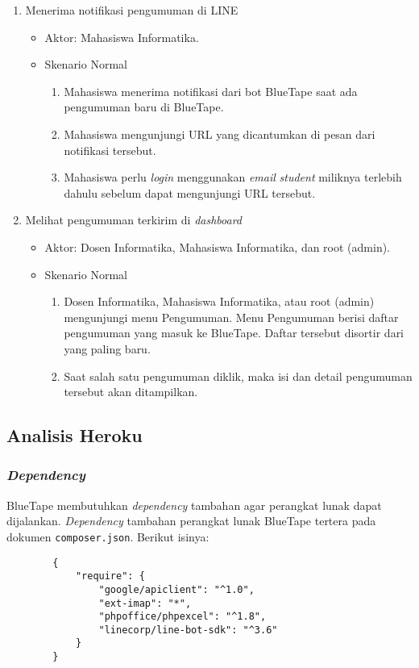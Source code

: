 \begin{enumerate}
\item Menerima notifikasi pengumuman di LINE

\begin{itemize}
	\item Aktor: Mahasiswa Informatika.
	\item Skenario Normal

	\begin{enumerate}
		\item Mahasiswa menerima notifikasi dari bot BlueTape saat ada pengumuman baru di BlueTape.
		\item Mahasiswa mengunjungi URL yang dicantumkan di pesan dari notifikasi tersebut. 
		\item Mahasiswa perlu \textit{login} menggunakan \textit{email} \textit{student} miliknya terlebih dahulu sebelum dapat mengunjungi URL tersebut.
	\end{enumerate}
\end{itemize}

\item Melihat pengumuman terkirim di \textit{dashboard}

\begin{itemize}
	\item Aktor: Dosen Informatika, Mahasiswa Informatika, dan root (admin).
	\item Skenario Normal

	\begin{enumerate}
		\item Dosen Informatika, Mahasiswa Informatika, atau root (admin) mengunjungi menu Pengumuman. Menu Pengumuman berisi daftar pengumuman yang masuk ke BlueTape. Daftar tersebut disortir dari yang paling baru.
		\item Saat salah satu pengumuman diklik, maka isi dan detail pengumuman tersebut akan ditampilkan.
	\end{enumerate}
\end{itemize}
\end{enumerate}

\subsection{Analisis Heroku}
	\subsubsection{\textit{Dependency}}
		BlueTape membutuhkan \textit{dependency} tambahan agar perangkat lunak dapat dijalankan. \textit{Dependency} tambahan perangkat lunak BlueTape tertera pada dokumen \texttt{composer.json}. Berikut isinya:
		\begin{lstlisting}
		{
		    "require": {
		        "google/apiclient": "^1.0",
				"ext-imap": "*",
		        "phpoffice/phpexcel": "^1.8",
		        "linecorp/line-bot-sdk": "^3.6"
		    }
		}
		\end{lstlisting}
		

